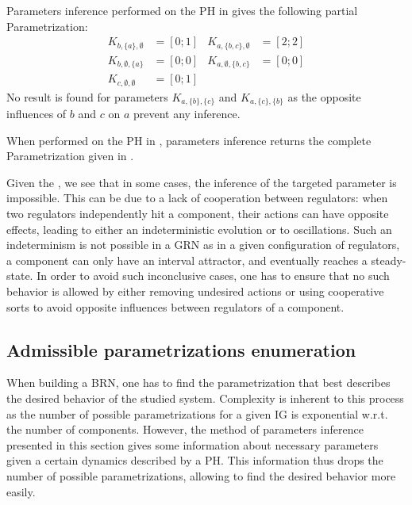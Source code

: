 \begin{example*}
Parameters inference performed on the PH in  gives the following partial Parametrization:
\begin{align*}
K_{b,\{a\},\emptyset} &= [0 ; 1] & K_{a,\{b,c\},\emptyset} &= [2 ; 2] \\
K_{b,\emptyset,\{a\}} &= [0 ; 0] & K_{a,\emptyset,\{b,c\}} &= [0 ; 0] \\
K_{c,\emptyset,\emptyset} &= [0 ; 1]
\end{align*}
No result is found for parameters $K_{a,\{b\},\{c\}}$ and $K_{a,\{c\},\{b\}}$ as the opposite influences of $b$ and $c$ on $a$ prevent any inference.

When performed on the PH in , parameters inference returns the complete Parametrization given in .
\end{example*}

Given the , we see that in some cases, the inference of the targeted parameter is impossible.
This can be due to a lack of cooperation between regulators: when two regulators independently hit a component, their actions can have opposite effects, leading to either an indeterministic evolution or to oscillations.
Such an indeterminism is not possible in a GRN as in a given configuration of regulators, a component can only have an interval attractor, and eventually reaches a steady-state.
In order to avoid such inconclusive cases, one has to ensure that no such behavior is allowed by either removing undesired actions or using cooperative sorts to avoid opposite influences between regulators of a component.


\subsection{Admissible parametrizations enumeration}\label{ssec:admissible-K}

When building a BRN, one has to find the parametrization that best describes the desired behavior of the studied system.
Complexity is inherent to this process as the number of possible parametrizations for a given IG is exponential w.r.t. the number of components.
However, the method of parameters inference presented in this section gives some information about necessary parameters given a certain dynamics described by a PH.
This information thus drops the number of possible parametrizations, allowing to find the desired behavior more easily.

